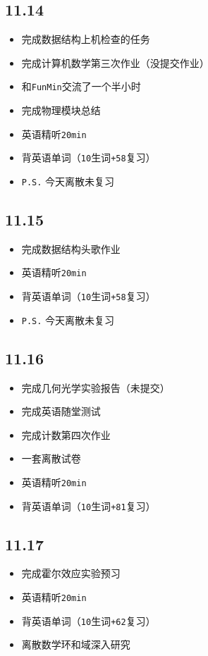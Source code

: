 \documentclass[UTF8]{ctexart}
\begin{document}
\subsection*{11.14}
\begin{itemize}
    \item 完成数据结构上机检查的任务
    \item 完成计算机数学第三次作业（没提交作业）
    \item 和\verb|FunMin|交流了一个半小时
    \item 完成物理模块总结
    \item 英语精听\verb|20min|
    \item 背英语单词（\verb|10|生词\verb|+|\verb|58|复习）
    \item \verb|P.S.| 今天离散未复习
\end{itemize}
\subsection*{11.15}
\begin{itemize}
    \item 完成数据结构头歌作业
    \item 英语精听\verb|20min|
    \item 背英语单词（\verb|10|生词\verb|+|\verb|58|复习）
    \item \verb|P.S.| 今天离散未复习
\end{itemize}
\subsection*{11.16}
\begin{itemize}
    \item 完成几何光学实验报告（未提交）
    \item 完成英语随堂测试
    \item 完成计数第四次作业
    \item 一套离散试卷
    \item 英语精听\verb|20min|
    \item 背英语单词（\verb|10|生词\verb|+|\verb|81|复习）
\end{itemize}
\subsection*{11.17}
\begin{itemize}
    \item 完成霍尔效应实验预习
    \item 英语精听\verb|20min|
    \item 背英语单词（\verb|10|生词\verb|+|\verb|62|复习）
    \item 离散数学环和域深入研究
\end{itemize}
\end{document}
